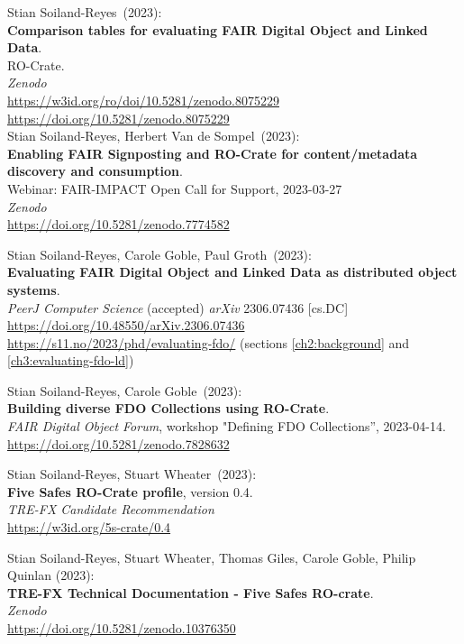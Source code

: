 \begin{thebibliography}{9}
Stian Soiland-Reyes~(2023): \\
\textbf{Comparison tables for evaluating FAIR Digital Object and Linked Data}.\\
RO-Crate. \\
\emph{Zenodo}\\
\url{https://w3id.org/ro/doi/10.5281/zenodo.8075229}\\
\url{https://doi.org/10.5281/zenodo.8075229}\\

Stian Soiland-Reyes, Herbert Van de Sompel~(2023): \\
\textbf{Enabling FAIR Signposting and RO-Crate for content/metadata discovery and consumption}.\\
Webinar: FAIR-IMPACT Open Call for Support, 2023-03-27 \\
\emph{Zenodo} \\
\url{https://doi.org/10.5281/zenodo.7774582}

Stian Soiland-Reyes, Carole Goble, Paul Groth~(2023): \\
\textbf{Evaluating FAIR Digital Object and Linked Data as distributed object systems}.\\
\emph{PeerJ Computer Science} (accepted)  
\emph{arXiv} 2306.07436 [cs.DC]  
\url{https://doi.org/10.48550/arXiv.2306.07436}\\
\url{https://s11.no/2023/phd/evaluating-fdo/}
(sections \vref{ch2:background} and \vref{ch3:evaluating-fdo-ld})

Stian Soiland-Reyes, Carole Goble~(2023): \\
\textbf{Building diverse FDO Collections using RO-Crate}.\\
\emph{FAIR Digital Object Forum}, workshop "Defining FDO Collections”, 2023-04-14.\\
\url{https://doi.org/10.5281/zenodo.7828632}

Stian Soiland-Reyes, Stuart Wheater~(2023): \\
\textbf{Five Safes RO-Crate profile}, version 0.4.\\
\emph{TRE-FX Candidate Recommendation} \\
\url{https://w3id.org/5s-crate/0.4}

Stian Soiland-Reyes, Stuart Wheater, Thomas Giles, Carole Goble, Philip Quinlan (2023):\\  \textbf{TRE-FX Technical Documentation - Five Safes RO-crate}.  \\
\emph{Zenodo} \\
\url{https://doi.org/10.5281/zenodo.10376350}



\end{thebibliography}
